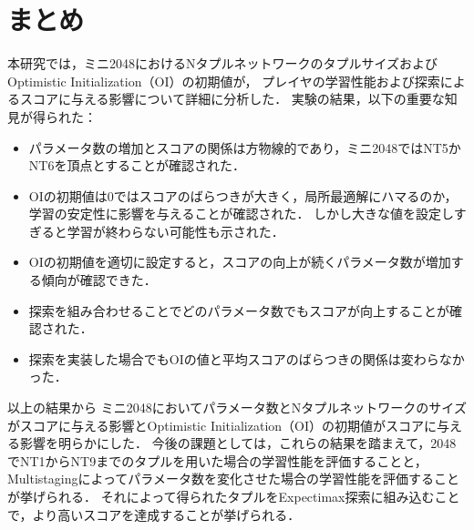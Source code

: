 \newpage
\section{まとめ}
本研究では，ミニ2048におけるNタプルネットワークのタプルサイズおよびOptimistic Initialization（OI）の初期値が，
プレイヤの学習性能および探索によるスコアに与える影響について詳細に分析した．
実験の結果，以下の重要な知見が得られた：
\begin{itemize}
\item パラメータ数の増加とスコアの関係は方物線的であり，ミニ2048ではNT5かNT6を頂点とすることが確認された．
\item OIの初期値は0ではスコアのばらつきが大きく，局所最適解にハマるのか，学習の安定性に影響を与えることが確認された．
しかし大きな値を設定しすぎると学習が終わらない可能性も示された．
\item OIの初期値を適切に設定すると，スコアの向上が続くパラメータ数が増加する傾向が確認できた．
\item 探索を組み合わせることでどのパラメータ数でもスコアが向上することが確認された．
\item 探索を実装した場合でもOIの値と平均スコアのばらつきの関係は変わらなかった．
\end{itemize}

以上の結果から
ミニ2048においてパラメータ数とNタプルネットワークのサイズがスコアに与える影響とOptimistic Initialization（OI）の初期値がスコアに与える影響を明らかにした．
今後の課題としては，これらの結果を踏まえて，2048でNT1からNT9までのタプルを用いた場合の学習性能を評価することと，
Multistagingによってパラメータ数を変化させた場合の学習性能を評価することが挙げられる．
それによって得られたタプルをExpectimax探索に組み込むことで，より高いスコアを達成することが挙げられる．
